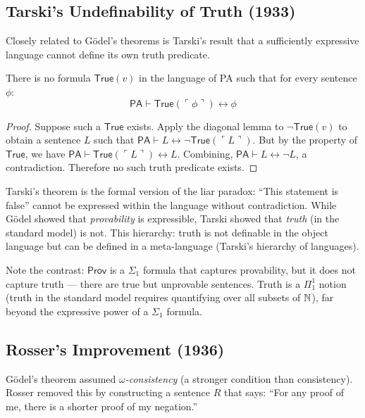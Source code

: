 \subsection{Tarski's Undefinability of Truth (1933)}
\label{sec:godel:tarski}

Closely related to Gödel's theorems is Tarski's result that a sufficiently expressive language cannot define its own truth predicate.

\begin{theorem}
There is no formula $\mathsf{True}(v)$ in the language of PA such that for every sentence $\phi$:
\[
\mathsf{PA} \vdash \mathsf{True}(\ulcorner \phi \urcorner) \leftrightarrow \phi
\]
\end{theorem}

\begin{proof}
Suppose such a $\mathsf{True}$ exists. Apply the diagonal lemma to $\neg \mathsf{True}(v)$ to obtain a sentence $L$ such that $\mathsf{PA} \vdash L \leftrightarrow \neg \mathsf{True}(\ulcorner L \urcorner)$. But by the property of $\mathsf{True}$, we have $\mathsf{PA} \vdash \mathsf{True}(\ulcorner L \urcorner) \leftrightarrow L$. Combining, $\mathsf{PA} \vdash L \leftrightarrow \neg L$, a contradiction. Therefore no such truth predicate exists.
\end{proof}

Tarski's theorem is the formal version of the liar paradox: ``This statement is false'' cannot be expressed within the language without contradiction. While Gödel showed that \emph{provability} is expressible, Tarski showed that \emph{truth} (in the standard model) is not. This hierarchy: truth is not definable in the object language but can be defined in a meta-language (Tarski's hierarchy of languages).

Note the contrast: $\mathsf{Prov}$ is a $\Sigma_1$ formula that captures provability, but it does not capture truth --- there are true but unprovable sentences. Truth is a $\Pi_1^1$ notion (truth in the standard model requires quantifying over all subsets of $\mathbb{N}$), far beyond the expressive power of a $\Sigma_1$ formula.

\subsection{Rosser's Improvement (1936)}
\label{sec:godel:rosser}

Gödel's theorem assumed \emph{$\omega$-consistency} (a stronger condition than consistency). Rosser removed this by constructing a sentence $R$ that says: ``For any proof of me, there is a shorter proof of my negation.''

